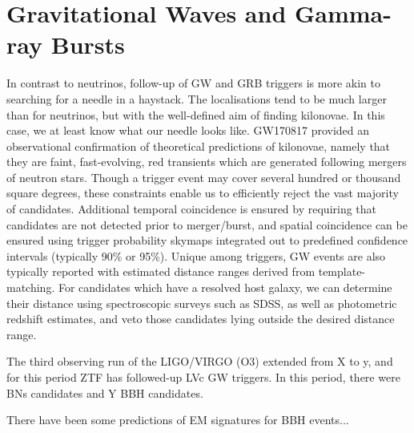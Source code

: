 \section{Gravitational Waves and Gamma-ray Bursts}
In contrast to neutrinos, follow-up of GW and GRB triggers is more akin to searching for a needle in a haystack. The localisations tend to be much larger than for neutrinos, but with the well-defined aim of finding kilonovae. In this case, we at least know what our needle looks like. GW170817 provided an observational confirmation of theoretical predictions of kilonovae, namely that they are faint, fast-evolving, red transients which are generated following mergers of neutron stars. Though a trigger event may cover several hundred or thousand square degrees, these constraints enable us to efficiently reject the vast majority of candidates. Additional temporal coincidence is ensured by requiring that candidates are not detected prior to merger/burst, and spatial coincidence can be ensured using trigger probability skymaps integrated out to predefined confidence intervals (typically 90\% or 95\%). Unique among triggers, GW events are also typically reported with estimated distance ranges derived from template-matching. For candidates which have a resolved host galaxy, we can determine their distance using spectroscopic surveys such as SDSS, as well as photometric redshift estimates, and veto those candidates lying outside the desired distance range.

The third observing run of the LIGO/VIRGO (O3) extended from X to y, and for this period ZTF has followed-up LVc GW triggers. In this period, there were BNs candidates and Y BBH candidates.

There have been some predictions of EM signatures for BBH events...

